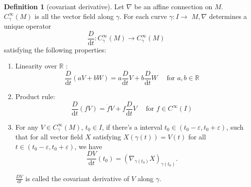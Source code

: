 \documentclass[12pt,a4paper]{book}
\newcommand{\dd}{\text{d}}
\newenvironment{enu}{\begin{enumerate}[(1)]}{\end{enumerate}}
\theoremstyle{definition}
\newtheorem{defn}{Definition}[section]
\begin{document}
\begin{defn}[covariant derivative]
    Let $\nabla$ be an affine connection on $M$. $C_{\gamma}^{\infty}(M)$ is all the vector field along $\gamma$.
    For each curve $\gamma: I \rightarrow$ $M, \nabla$ determines a unique operator
    $$
        \frac{D}{\dd t}: C_{\gamma}^{\infty}(M) \rightarrow C_{\gamma}^{\infty}(M)
    $$
    satisfying the following properties:
    \begin{enu}
        \item Linearity over $\mathbb{R}$ :
        $$
            \frac{D}{\dd t}(a V+b W)=a\frac{D}{\dd t} V+b \frac{D}{\dd t} W \quad \text { for } a, b \in \mathbb{R}
        $$
        \item Product rule:
        $$
            \frac{D}{\dd t}(f V)=\dot{f} V+f  \frac{D}{\dd t} V \quad \text { for } f \in C^{\infty}(I)
        $$
        \item For any $V\in C_{\gamma}^{\infty}(M)$,  $t_0\in I$, if there's a interval $t_0\in (t_0-\varepsilon,t_0+\varepsilon)$,
        such that for all vector field $X$ satisfying $X(\gamma(t))=V(t)$ for all $t\in (t_0-\varepsilon,t_0+\varepsilon)$, we have
        $$
            \frac{DV}{\dd t}(t_0)=(\nabla_{\dot{\gamma}(t_0)}X)_{\gamma(t_0)} .
        $$

        $\frac{DV}{\dd t}$ is called the covariant derivative of $V$ along $\gamma$.
    \end{enu}
\end{defn}
\end{document}
